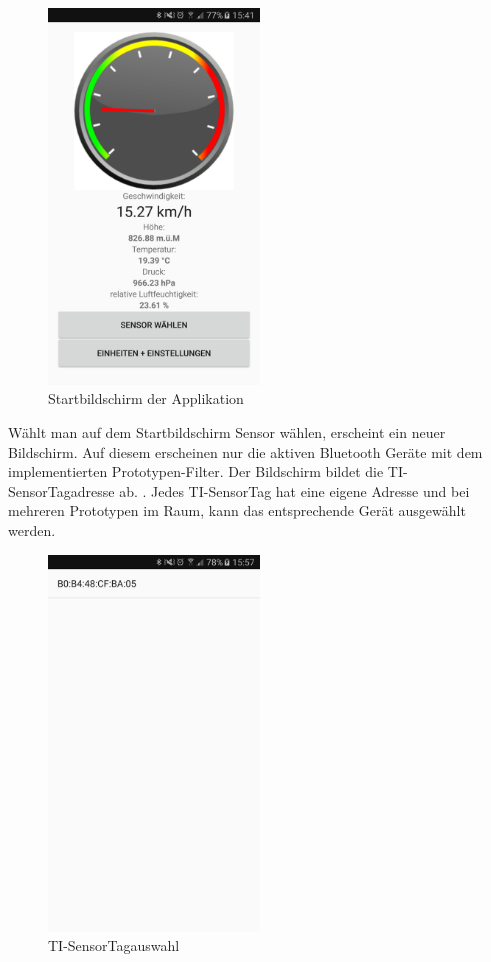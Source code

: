 \begin{figure}[ht]
    \includegraphics[width=0.5\textwidth]{4Resultate/imag/APPHomeScreen.png} 
    \caption{Startbildschirm der Applikation}
    \label{tacho}
\end{figure}

Wählt man auf dem Startbildschirm \glqq Sensor wählen\grqq,  erscheint ein neuer Bildschirm. Auf diesem erscheinen nur die aktiven Bluetooth Geräte mit dem implementierten Prototypen-Filter. Der Bildschirm bildet die TI-SensorTagadresse ab. . Jedes TI-SensorTag hat eine eigene Adresse und bei mehreren Prototypen im Raum, kann das entsprechende Gerät ausgewählt werden.


\begin{figure}[ht]
    \includegraphics[width=0.5\textwidth]{4Resultate/imag/BLEAdresseAuswaehlen.png} 
    \caption{TI-SensorTagauswahl}
    \label{sensorauswahl}
\end{figure}

